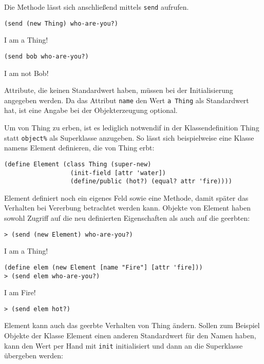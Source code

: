 Die Methode lässt sich anschließend mittels \texttt{send} aufrufen.

\begin{lstlisting}
(send (new Thing) who-are-you?)
\end{lstlisting}
{\routput {\qq}I am a Thing!{\qq}}

\begin{lstlisting}
(send bob who-are-you?)
\end{lstlisting}
{\routput {\qq}I am not Bob!{\qq}}

Attribute, die keinen Standardwert haben, müssen bei der Initialisierung angegeben werden. Da das Attribut \texttt{name} den Wert  \texttt{{\qq}a Thing{\qq}} als Standardwert hat, ist eine Angabe bei der Objekterzeugung optional. 

Um von Thing zu erben, ist es lediglich notwendif in der Klassendefinition Thing statt \texttt{object\%} als Superklasse anzugeben. So lässt sich beispielweise eine Klasse namens Element definieren, die von Thing erbt:

\begin{lstlisting}
(define Element (class Thing (super-new)
                  (init-field [attr 'water])
                  (define/public (hot?) (equal? attr 'fire))))
\end{lstlisting}

Element definiert noch ein eigenes Feld sowie eine Methode, damit später das Verhalten bei Vererbung betrachtet werden kann. Objekte von Element haben sowohl Zugriff auf die neu definierten Eigenschaften als auch auf die geerbten:

\begin{lstlisting}
> (send (new Element) who-are-you?)
\end{lstlisting}
{\routput {\qq}I am a Thing!\qq}

\begin{lstlisting}
(define elem (new Element [name "Fire"] [attr 'fire]))
> (send elem who-are-you?)
\end{lstlisting} 
{\routput {\qq}I am Fire!\qq}
\begin{lstlisting}
> (send elem hot?)
\end{lstlisting} 
{}

Element kann auch das geerbte Verhalten von Thing ändern. Sollen zum Beispiel Objekte der Klasse Element einen anderen Standardwert für den Namen haben, kann den Wert per Hand mit \texttt{init} initialisiert und dann an die Superklasse übergeben werden:

